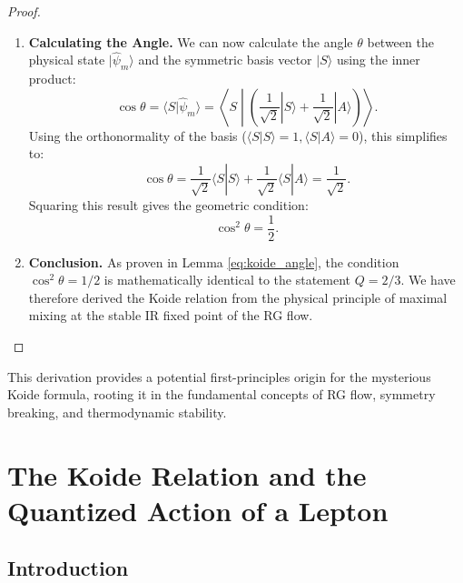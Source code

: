 \documentclass[11pt, letterpaper]{report}
\theoremstyle{plain} %
\theoremstyle{definition} %
\theoremstyle{remark} %
\begin{document}
\begin{proof}
\begin{enumerate}
    \item \textbf{Calculating the Angle.} We can now calculate the angle $\theta$ between the physical state $|\hat{\psi}_m\rangle$ and the symmetric basis vector $|S\rangle$ using the inner product:
    \begin{equation}
        \cos\theta = \langle S | \hat{\psi}_m \rangle = \left\langle S \middle| \left( \frac{1}{\sqrt{2}}|S\rangle + \frac{1}{\sqrt{2}}|A\rangle \right) \right\rangle.
    \end{equation}
    Using the orthonormality of the basis ($\langle S|S\rangle=1, \langle S|A\rangle=0$), this simplifies to:
    \begin{equation}
        \cos\theta = \frac{1}{\sqrt{2}}\langle S|S\rangle + \frac{1}{\sqrt{2}}\langle S|A\rangle = \frac{1}{\sqrt{2}}.
    \end{equation}
    Squaring this result gives the geometric condition:
    \begin{equation}
        \cos^2\theta = \frac{1}{2}.
    \end{equation}

    \item \textbf{Conclusion.} As proven in Lemma \ref{eq:koide_angle}, the condition $\cos^2\theta=1/2$ is mathematically identical to the statement $Q=2/3$. We have therefore derived the Koide relation from the physical principle of maximal mixing at the stable IR fixed point of the RG flow.
\end{enumerate}
\end{proof}

This derivation provides a potential first-principles origin for the mysterious Koide formula, rooting it in the fundamental concepts of RG flow, symmetry breaking, and thermodynamic stability.

\section{The Koide Relation and the Quantized Action of a Lepton}
\label{sec:koide_action_synthesis}

\subsection{Introduction}
\end{document}
